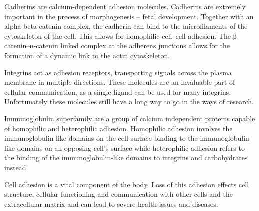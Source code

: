 Cadherins are calcium-dependent adhesion molecules. Cadherins are extremely important in the process of morphogenesis -- fetal development. Together with an alpha-beta catenin complex, the cadherin can bind to the microfilaments of the cytoskeleton of the cell. This allows for homophilic cell--cell adhesion. The β-catenin--α-catenin linked complex at the adherens junctions allows for the formation of a dynamic link to the actin cytoskeleton.

Integrins act as adhesion receptors, transporting signals across the plasma membrane in multiple directions. These molecules are an invaluable part of cellular communication, as a single ligand can be used for many integrins. Unfortunately these molecules still have a long way to go in the ways of research.

Immunoglobulin superfamily are a group of calcium independent proteins capable of homophilic and heterophilic adhesion. Homophilic adhesion involves the immunoglobulin-like domains on the cell surface binding to the immunoglobulin-like domains on an opposing cell's surface while heterophilic adhesion refers to the binding of the immunoglobulin-like domains to integrins and carbohydrates instead.

Cell adhesion is a vital component of the body. Loss of this adhesion effects cell structure, cellular functioning and communication with other cells and the extracellular matrix and can lead to severe health issues and diseases.


